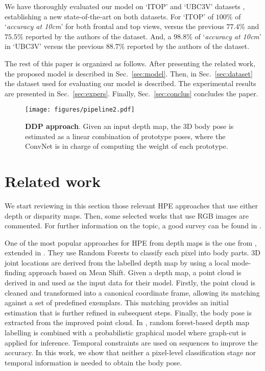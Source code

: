 \documentclass[review,12pt,3p]{elsarticle}
\begin{document}
We have thoroughly evaluated our model on `ITOP' \cite{haque2016eccv} and `UBC3V' datasets \citep{Shafaei16}, establishing a new state-of-the-art on both datasets. For `ITOP' of $100\%$ of `\textit{accuracy at 10cm}' for both frontal and top views, versus the previous $77.4\%$ and $75.5\%$ reported by the authors of the dataset.
And, a $98.8\%$ of `\textit{accuracy at 10cm}' in `UBC3V' versus the previous $88.7\%$ reported by the authors of the dataset.


The rest of this paper is organized as follows. After presenting the related work, the proposed model is described in Sec.~\ref{sec:model}. Then, in Sec.~\ref{sec:dataset} the dataset used for evaluating our model is described. The experimental results are presented in Sec.~\ref{sec:expers}. Finally, Sec.~\ref{sec:conclus} concludes the paper.

\begin{figure}[t]
\centering
  \texttt{[image: figures/pipeline2.pdf]}
  \caption{\textbf{DDP approach}. Given an input depth map, the 3D body pose is estimated as a linear combination of prototype poses, where the ConvNet is in charge of computing the weight of each prototype.}
  \label{fig:teaser}
\end{figure}

\section{Related work} \label{sec:relworks}
We start reviewing in this section those relevant HPE approaches that use either depth or disparity maps. Then, some selected works that use RGB images are commented. 
For further information on the topic, a good survey can be found in \citep{liu2015}.



One of the most popular approaches for HPE from depth maps is the one from \citep{Shotton11cvpr}, extended in \citep{Shotton2013pami}. They use Random Forests to classify each pixel into body parts. 3D joint locations are derived from the  labelled depth map by using a local mode-finding approach based on Mean Shift.
Given a depth map, a point cloud is derived in \cite{ye2011iccv} and used as the input data for their model. Firstly, the point cloud is cleaned and transformed into a canonical coordinate frame, allowing its matching against a set of predefined exemplars. This matching provides an initial estimation that is further refined in subsequent steps. Finally, the body pose is extracted from the improved point cloud.
In \citep{Hernandez2012}, random forest-based depth map labelling is combined with a probabilistic graphical model where graph-cut is applied for inference. Temporal constraints are used on sequences to improve the accuracy. 
In this work, we show that neither a pixel-level classification stage nor temporal information is needed to obtain the body pose.
\end{document}
